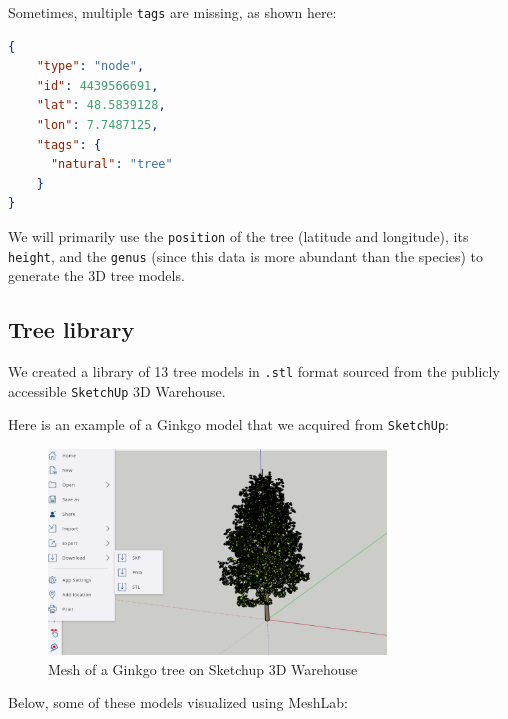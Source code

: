 \documentclass[12pt]{article}
\begin{document}
Sometimes, multiple \texttt{tags} are missing, as shown here:

\begin{lstlisting}[language=json]
{
    "type": "node",
    "id": 4439566691,
    "lat": 48.5839128,
    "lon": 7.7487125,
    "tags": {
      "natural": "tree"
    }
}
\end{lstlisting}

We will primarily use the \texttt{position} of the tree (latitude and
longitude), its \texttt{height}, and the \texttt{genus} (since this data is
more abundant than the species) to generate the 3D tree models.

\subsection{Tree library}
We created a library of 13 tree models in \texttt{.stl} format sourced from
the publicly accessible \texttt{SketchUp}\cite{sketchup} 3D Warehouse.

Here is an example of a Ginkgo model that we acquired from \texttt{SketchUp}:

\begin{figure}[H]
    \centering
        \centering
        \includegraphics[width=0.8\textwidth]{images/ginkgo-sketchup.png}
        \caption{Mesh of a Ginkgo tree on Sketchup 3D Warehouse}
\end{figure}

\newpage

Below, some of these models visualized using MeshLab\cite{meshlab}:
\end{document}
